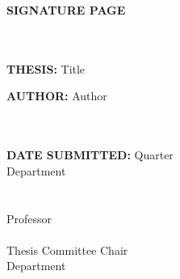 \begin{titlepage}
\begin{large}
\textbf{SIGNATURE PAGE} \\~\\~\\

\raggedright\textbf{THESIS:} \hspace{3.25cm}
Title \\

\raggedright\textbf{AUTHOR:} \hspace{2.8cm}
Author \\~\\~\\

\raggedright\textbf{DATE SUBMITTED:}
\hspace{0.2cm} Quarter \\
\hspace{5.64cm} Department \\~\\~\\

Professor \\
\underline{\hspace{5cm}} \\
Thesis Committee Chair \\
Department \\~\\~\\

\end{large}
\end{titlepage}